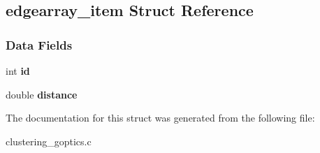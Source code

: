 \hypertarget{structedgearray__item}{}\subsection{edgearray\+\_\+item Struct Reference}
\label{structedgearray__item}
\subsubsection*{Data Fields}
\begin{DoxyCompactItemize}
\item 
\mbox{\label{structedgearray__item_af1399bc48a35b90101ce7ebfcf9ac363}} 
int {\bfseries id}
\item 
\mbox{\label{structedgearray__item_a0cee1b439a876e46d1338564a2e3bf17}} 
double {\bfseries distance}
\end{DoxyCompactItemize}


The documentation for this struct was generated from the following file\+:\begin{DoxyCompactItemize}
\item 
clustering\+\_\+goptics.\+c\end{DoxyCompactItemize}
